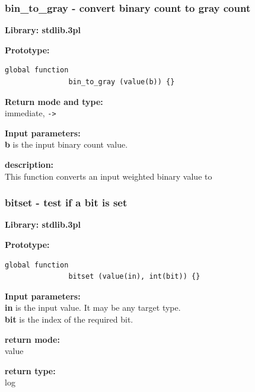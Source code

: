         \subsubsection{bin\_to\_gray - convert binary count to gray count}\label{sec:lfbintogray}

            {\bf Library: stdlib.3pl}

            {\bf Prototype:} \\
            \vsp
            \begin{lstlisting}[gobble=12, language=threepl]
               global function
               bin_to_gray (value(b)) {}
            \end{lstlisting}

            {\bf Return mode and type:} \\
            immediate, \verb'->'

            {\bf Input parameters:} \\            
            {\bf b} is the input binary count value.

            {\bf description:} \\
            This function converts an input weighted binary value to




        \subsubsection{bitset - test if a bit is set}\label{sec:lfbitset}

            {\bf Library: stdlib.3pl}

            {\bf Prototype:} \\
            \vsp
            \begin{lstlisting}[gobble=12, language=threepl]
               global function
               bitset (value(in), int(bit)) {}
            \end{lstlisting}

            {\bf Input parameters:} \\            
            {\bf in} is the input value. It may be any target type.\\
            {\bf bit} is the index of the required bit.

            {\bf return mode:} \\
            value

            {\bf return type:} \\
            log

